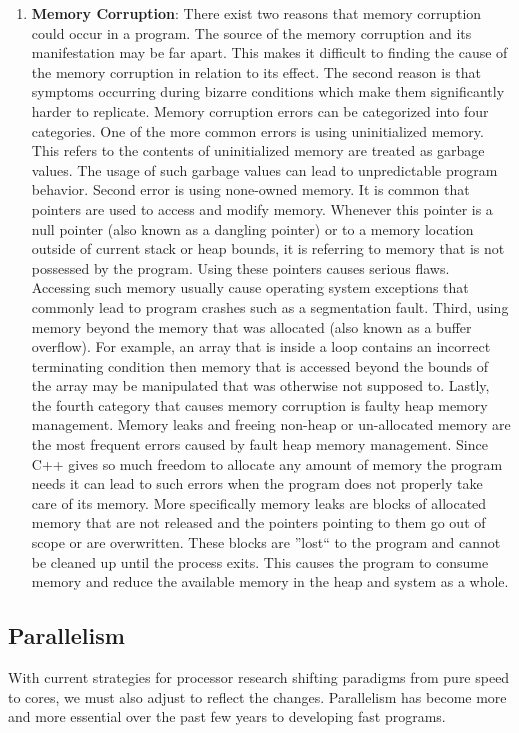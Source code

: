 \documentclass[letterpaper, 11pt]{article}
\begin{document}
\begin{enumerate}
  \item {\bfseries Memory Corruption}:
  There exist two reasons that memory corruption could occur in a program. The source of the 
  memory corruption and its manifestation may be far apart. This makes it difficult to finding 
  the cause of the memory corruption in relation to its effect. The second reason is that symptoms 
  occurring during bizarre conditions which make them significantly harder to replicate. Memory 
  corruption errors can be categorized into four categories. One of the more common errors is using 
  uninitialized memory. This refers to the contents of uninitialized memory are treated as garbage 
  values. The usage of such garbage values can lead to unpredictable program behavior. Second error 
  is using none-owned memory. It is common that pointers are used to access and modify memory. 
  Whenever this pointer is a null pointer (also known as a dangling pointer) or to a memory location 
  outside of current stack or heap bounds, it is referring to memory that is not possessed by the program. 
  Using these pointers causes serious flaws. Accessing such memory usually cause operating system exceptions that commonly 
  lead to program crashes such as a segmentation fault. Third, using memory beyond the memory that was 
  allocated (also known as a buffer overflow). For example, an array that is inside a loop contains an 
  incorrect terminating condition then memory that is accessed beyond the bounds of the array may be 
  manipulated that was otherwise not supposed to. Lastly, the fourth category that causes memory corruption 
  is faulty heap memory management. Memory leaks and freeing non-heap or un-allocated memory are the 
  most frequent errors caused by fault heap memory management. Since C++ gives so much freedom to 
  allocate any amount of memory the program needs it can lead to such errors when the program does 
  not properly take care of its memory. More specifically memory leaks are blocks of allocated memory 
  that are not released and the pointers pointing to them go out of scope or are overwritten. These blocks
  are ''lost`` to the program and cannot be cleaned up until the process exits. This causes the program to 
  consume memory and reduce the available memory in the heap and system as a whole.
\end{enumerate}

\subsection{Parallelism}
With current strategies for processor research shifting paradigms from pure speed to cores,
we must also adjust to reflect the changes. Parallelism has become more and more essential
over the past few years to developing fast programs.
\end{document}
